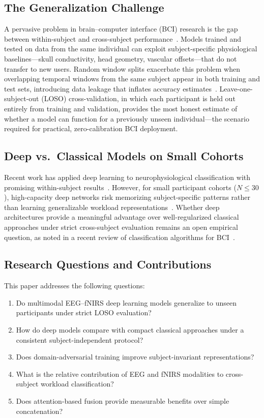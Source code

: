 \documentclass[conference]{IEEEtran}
\begin{document}
\subsection{The Generalization Challenge}
A pervasive problem in brain--computer interface (BCI) research is the gap between within-subject and cross-subject performance~\cite{lotte2018review, schirrmeister2017deep}. Models trained and tested on data from the same individual can exploit subject-specific physiological baselines---skull conductivity, head geometry, vascular offsets---that do not transfer to new users. Random window splits exacerbate this problem when overlapping temporal windows from the same subject appear in both training and test sets, introducing data leakage that inflates accuracy estimates~\cite{wu2022transfer}. Leave-one-subject-out (LOSO) cross-validation, in which each participant is held out entirely from training and validation, provides the most honest estimate of whether a model can function for a previously unseen individual---the scenario required for practical, zero-calibration BCI deployment.

\subsection{Deep vs.\ Classical Models on Small Cohorts}
Recent work has applied deep learning to neurophysiological classification with promising within-subject results~\cite{schirrmeister2017deep, lawhern2018eegnet}. However, for small participant cohorts ($N \leq 30$), high-capacity deep networks risk memorizing subject-specific patterns rather than learning generalizable workload representations~\cite{roy2019deep}. Whether deep architectures provide a meaningful advantage over well-regularized classical approaches under strict cross-subject evaluation remains an open empirical question, as noted in a recent review of classification algorithms for BCI~\cite{lotte2018review}.

\subsection{Research Questions and Contributions}
This paper addresses the following questions:
\begin{enumerate}
    \item Do multimodal EEG--fNIRS deep learning models generalize to unseen participants under strict LOSO evaluation?
    \item How do deep models compare with compact classical approaches under a consistent subject-independent protocol?
    \item Does domain-adversarial training improve subject-invariant representations?
    \item What is the relative contribution of EEG and fNIRS modalities to cross-subject workload classification?
    \item Does attention-based fusion provide measurable benefits over simple concatenation?
\end{enumerate}
\end{document}
